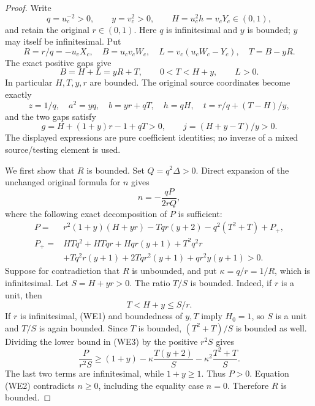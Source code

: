 \begin{proof}
Write
\[
 q=u_c^{-2}>0,\qquad y=v_c^2>0,
 \qquad H=u_c^2h=v_cY_c\in(0,1),
\]
and retain the original $r\in(0,1)$.  Here $q$ is infinitesimal
and $y$ is bounded; $y$ may itself be infinitesimal.  Put
\[
 R=r/q=-u_cX_c,\quad B=u_cv_cW_c,\quad
 L=v_c(u_cW_c-Y_c),\quad T=B-yR.
\]
The exact positive gaps give
\[
 B=H+L=yR+T,\qquad 0<T<H+y,\qquad L>0.
\]
In particular $H,T,y,r$ are bounded.  The original source coordinates
become exactly
\[
 z=1/q,\quad a^2=yq,\quad b=yr+qT,\quad h=qH,
 \quad t=r/q+(T-H)/y,
\]
and the two gaps satisfy
\[
             g=H+(1+y)r-1+qT>0,
 \qquad j=(H+y-T)/y>0.                             \tag{WE1}
\]
The displayed expressions are pure coefficient identities; no
inverse of a mixed source/testing element is used.

We first show that $R$ is bounded.  Set $Q=q^2\Delta>0$.
Direct expansion of the unchanged original formula for $n$ gives
\[
                         n=-\frac{qP}{2rQ},        \tag{WE2}
\]
where the following exact decomposition of $P$ is sufficient:
\begin{align*}
P={}&r^2(1+y)(H+yr)-Tqr(y+2)-q^2(T^2+T)+P_+,\\
P_+={}&HTq^2+HTqr+Hqr(y+1)+T^2q^2r\\
     &+Tq^2r(y+1)+2Tqr^2(y+1)+qr^2y(y+1)>0.        \tag{WE3}
\end{align*}
Suppose for contradiction that $R$ is unbounded, and put
$\kappa=q/r=1/R$, which is infinitesimal.  Let $S=H+yr>0$.
The ratio $T/S$ is bounded.  Indeed, if $r$ is a unit, then
\[
                T<H+y\leq S/r.
\]
If $r$ is infinitesimal, (WE1) and boundedness of $y,T$ imply
$H_0=1$, so $S$ is a unit and $T/S$ is again bounded.
Since $T$ is bounded, $(T^2+T)/S$ is bounded as well.  Dividing
the lower bound in (WE3) by the positive $r^2S$ gives
\[
 \frac{P}{r^2S}\geq (1+y)
       -\kappa\frac{T(y+2)}S
       -\kappa^2\frac{T^2+T}S.
\]
The last two terms are infinitesimal, while $1+y\geq1$.
Thus $P>0$.  Equation (WE2) contradicts $n\geq0$, including
the equality case $n=0$.  Therefore $R$ is bounded.


\end{proof}
